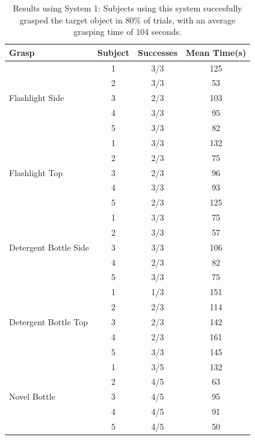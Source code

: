 \begin{table}
\centering
\begin{tabular}{ | l | c | c | c | }
\hline
Grasp & Subject & Successes & Mean Time(s) \\ \hline 
\multirow{5}{*}{Flashlight Side} & 1 & 3/3 & 125 \\ 
& 2 & 3/3 & 53 \\ 
& 3 & 2/3 & 103 \\
& 4 & 3/3 & 95 \\
& 5 & 3/3 & 82 \\ \hline
\multirow{5}{*}{Flashlight Top} & 1 & 3/3 & 132 \\ 
& 2 & 2/3 & 75 \\ 
& 3 & 2/3 & 96 \\
& 4 & 3/3 & 93 \\
& 5 & 2/3 & 125 \\ \hline
\multirow{5}{*}{\begin{minipage}{.75in}Detergent Bottle Side\end{minipage}} & 1 & 3/3 & 75 \\ 
& 2 & 3/3 & 57 \\ 
& 3 & 3/3 & 106 \\
& 4 & 2/3 & 82 \\
& 5 & 3/3 & 75 \\ \hline
\multirow{5}{*}{\begin{minipage}{.75in}Detergent Bottle Top\end{minipage}} & 1 & 1/3 & 151 \\ 
& 2 & 2/3 & 114 \\ 
& 3 & 2/3 & 142\\
& 4 & 2/3 & 161 \\
& 5 & 3/3 & 145 \\ \hline
\multirow{5}{*}{Novel Bottle} & 1 & 3/5 & 132 \\
&2 & 4/5 & 63\\
&3 & 4/5 & 95\\
&4 & 4/5 & 91\\
&5 & 4/5 & 50\\
\hline\end{tabular}
\caption{Results using System 1: Subjects using this system succesfully grasped the target object in 80\% of trials, with an average grasping time of 104 seconds. }
\label{tab:results_2}
\end{table}


